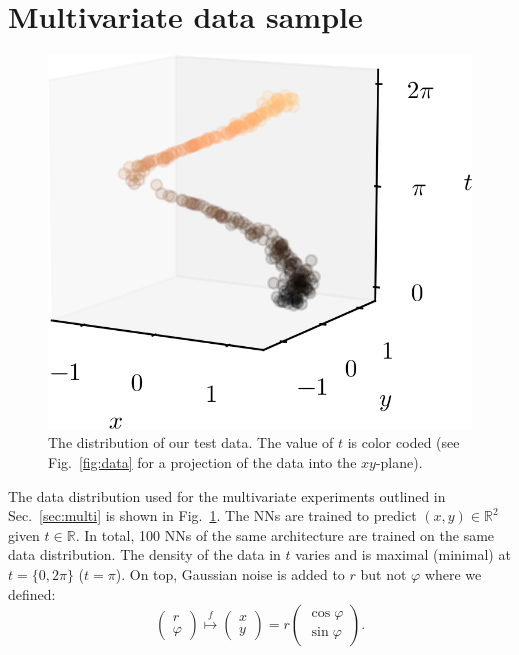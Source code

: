 \documentclass{article}
\begin{document}
\section{Multivariate data sample}
\label{sec:appendix_exp}
\begin{figure}
    \centering
    \includegraphics[scale=.8]{data.png}
    \caption{The distribution of our test data. The value of $t$ is color coded (see Fig.~\ref{fig:data} for a projection of the data into the $xy$-plane).}
    \label{fig:data_xyt}
\end{figure}
The data distribution used for the multivariate experiments outlined in Sec.~\ref{sec:multi} is shown in Fig.~\ref{fig:data_xyt}.
The NNs are trained to predict $(x, y) \in \mathbb{R}^2$ given $t \in \mathbb{R}$.
In total, 100 NNs of the same architecture are trained on the same data distribution.
The density of the data in $t$ varies and is maximal (minimal) at $t= \{ 0, 2\pi \}$ ($t=\pi$).
On top, Gaussian noise is added to $r$ but not $\varphi$ where we defined:
\begin{equation}
    \begin{pmatrix} r \\ \varphi \end{pmatrix} \overset{f}{\mapsto} \begin{pmatrix} x \\ y \end{pmatrix} = r \begin{pmatrix} \cos \varphi \\ \sin \varphi \end{pmatrix}.
\end{equation}
\end{document}
